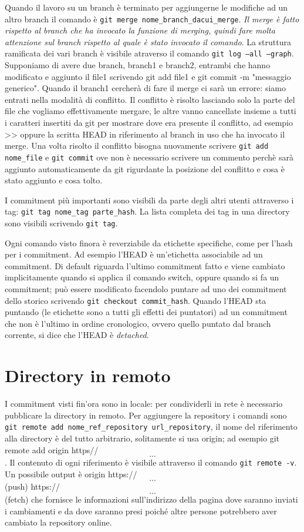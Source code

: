 Quando il lavoro su un branch è terminato per aggiungerne le modifiche ad un altro branch il comando è  \texttt{git merge nome\_branch\_dacui\_merge}. \emph{Il merge è fatto rispetto al branch che ha invocato la funzione di merging, quindi fare molta attenzione sul branch rispetto al quale è stato invocato il comando}. 
La struttura ramificata dei vari branch è visibile atraverso il comando \texttt{git log --all --graph}.
Supponiamo di avere due branch, branch1 e branch2, entrambi che hanno modificato e aggiunto il file1 scrivendo git add file1 e git commit -m "messaggio generico". 
Quando il branch1 cercherà di fare il merge ci sarà un errore: siamo entrati nella modalità di conflitto. 
Il conflitto è risolto lasciando solo la parte del file che vogliamo effettivamente mergare, le altre vanno cancellate insieme a tutti i caratteri insertiti da git per mostrare dove era presente il conflitto, ad esempio >> oppure la scritta HEAD in riferimento al branch in uso che ha invocato il merge.
Una volta risolto il conflitto bisogna nuovamente scrivere \texttt{git add nome\_file} e \texttt{git commit} ove non è necessario scrivere un commento perchè sarà aggiunto automaticamente da git rigurdante la posizione del conflitto e cosa è stato aggiunto e cosa tolto. 

I commitment più importanti sono visibili da parte degli altri utenti attraverso i tag: \texttt{git tag nome\_tag parte\_hash}.
La lista completa dei tag in una directory sono visibili scrivendo \texttt{git tag}.

Ogni comando visto finora è reverziabile da etichette specifiche, come per l'hash per i commitment.
Ad esempio l'HEAD è un'etichetta associabile ad un commitment.
Di default  riguarda l'ultimo commitment fatto e viene cambiato implicitamente quando si applica il comando switch, oppure quando si fa un commitment; può essere modificato facendolo puntare ad uno dei commitment dello storico scrivendo \texttt{git checkout commit\_hash}. 
Quando l'HEAD sta puntando (le etichette sono a tutti gli effetti dei puntatori) ad un commitment che non è l'ultimo in ordine cronologico, ovvero quello puntato dal branch corrente, si dice che l'HEAD è \emph{detached}.

\section{Directory in remoto}
I commitment visti fin'ora sono in locale: per condividerli in rete è necessario pubblicare la directory in remoto.
Per aggiungere la repository i comandi sono \texttt{git remote add nome\_ref\_repository url\_repository}, il nome del riferimento alla directory è del tutto arbitrario, solitamente si usa origin; ad esempio git remote add origin https//\[...\]. 
Il contenuto di ogni riferimento è visibile attraverso il comando \texttt{git remote -v}. Un possibile output è origin https://\[...\] (push) https://\[...\] (fetch) che fornisce le informazioni sull'indirizzo della pagina dove saranno inviati i cambiamenti e da dove saranno presi poiché altre persone potrebbero aver cambiato la repository online.

